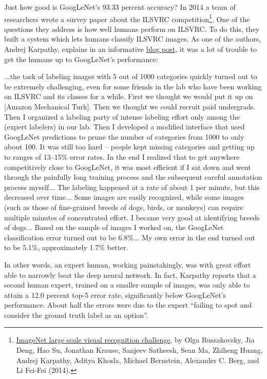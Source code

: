 \documentclass[a4paper,twoside,10pt]{book}
\begin{document}
Just how good is GoogLeNet's 93.33 percent accuracy? In 2014 a team of researchers wrote a survey paper about the ILSVRC competition\footnote{\href{http://arxiv.org/abs/1409.0575}{ImageNet large scale visual recognition challenge}, by Olga Russakovsky, Jia Deng, Hao Su, Jonathan Krause, Sanjeev Satheesh, Sean Ma, Zhiheng Huang, Andrej Karpathy, Aditya Khosla, Michael Bernstein, Alexander C. Berg, and Li Fei-Fei (2014).}. One of the questions they address is how well humans perform on ILSVRC. To do this, they built a system which lets humans classify ILSVRC images. As one of the authors, Andrej Karpathy, explains in an informative \href{http://karpathy.github.io/2014/09/02/what-i-learned-from-competing-against-a-convnet-on-imagenet/}{blog post}, it was a lot of trouble to get the humans up to GoogLeNet's performance:
\begin{adjustwidth}{1.5cm}{1cm}
...the task of labeling images with 5 out of 1000 categories quickly turned out to be extremely challenging, even for some friends in the lab who have been working on ILSVRC and its classes for a while. First we thought we would put it up on [Amazon Mechanical Turk]. Then we thought we could recruit paid undergrads. Then I organized a labeling party of intense labeling effort only among the (expert labelers) in our lab. Then I developed a modified interface that used GoogLeNet predictions to prune the number of categories from 1000 to only about 100. It was still too hard -- people kept missing categories and getting up to ranges of 13--15\% error rates. In the end I realized that to get anywhere competitively close to GoogLeNet, it was most efficient if I sat down and went through the painfully long training process and the subsequent careful annotation process myself... The labeling happened at a rate of about 1 per minute, but this decreased over time... Some images are easily recognized, while some images (such as those of fine-grained breeds of dogs, birds, or monkeys) can require multiple minutes of concentrated effort. I became very good at identifying breeds of dogs... Based on the sample of images I worked on, the GoogLeNet classification error turned out to be 6.8\%... My own error in the end turned out to be 5.1\%, approximately 1.7\% better.
\end{adjustwidth}
In other words, an expert human, working painstakingly, was with great effort able to narrowly beat the deep neural network. In fact, Karpathy reports that a second human expert, trained on a smaller sample of images, was only able to attain a 12.0 percent top-5 error rate, significantly below GoogLeNet's performance. About half the errors were due to the expert ``failing to spot and consider the ground truth label as an option''.
\end{document}
